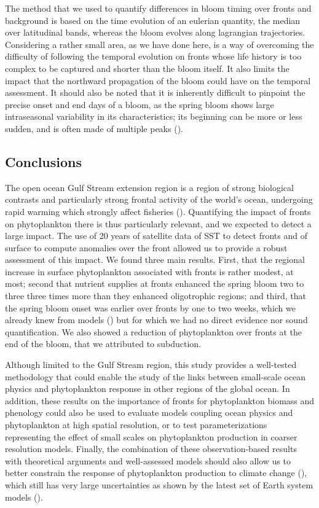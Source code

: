 The method that we used to quantify differences in bloom timing over fronts and background is based on the time evolution of an eulerian quantity, the  median over latitudinal bands, whereas the bloom evolves along lagrangian trajectories.
Considering a rather small area, as we have done here, is a way of overcoming the difficulty of following the temporal evolution on fronts whose life history is too complex to be captured and shorter than the bloom itself.
It also limits the impact that the northward propagation of the bloom could have on the temporal assessment.
It should also be noted that it is inherently difficult to pinpoint the precise onset and end days of a bloom, as the spring bloom shows large intraseasonal variability in its characteristics; its beginning can be more or less sudden, and is often made of multiple peaks (\cite{keerthi_2020}).


\subsection{Conclusions}

The open ocean Gulf Stream extension region is a region of strong biological contrasts and particularly strong frontal activity of the world's ocean, undergoing rapid warming which strongly affect fisheries (\cite{pershing_2015, neto_2021}).
Quantifying the impact of fronts on phytoplankton there is thus particularly relevant, and we expected to detect a large impact.
The use of 20 years of satellite data of SST to detect fronts and of surface  to compute anomalies over the front allowed us to provide a robust assessment of this impact.
We found three main results.
First, that the regional increase in surface phytoplankton associated with fronts is rather modest,  at most; second that nutrient supplies at fronts enhanced the spring bloom two to three three times more than they enhanced oligotrophic regions; and third, that the spring bloom onset was earlier over fronts by one to two weeks, which we already knew from models (\cite{karleskind_2011, mahadevan_2012}) but for which we had no direct evidence nor sound quantification.
We also showed a reduction of phytoplankton over fronts at the end of the bloom, that we attributed to subduction.

Although limited to the Gulf Stream region, this study provides a well-tested methodology that could enable the study of the links between small-scale ocean physics and phytoplankton response in other regions of the global ocean.
In addition, these results on the importance of fronts for phytoplankton biomass and phenology could also be used to evaluate models coupling ocean physics and phytoplankton at high spatial resolution, or to test parameterizations representing the effect of small scales on phytoplankton production in coarser resolution models.
Finally, the combination of these observation-based results with theoretical arguments and well-assessed models should also allow us to better constrain the response of phytoplankton production to climate change (\cite{couespel_2021}), which still has very large uncertainties as shown by the latest set of Earth system models (\cite{kwiatkowski_2020}).


